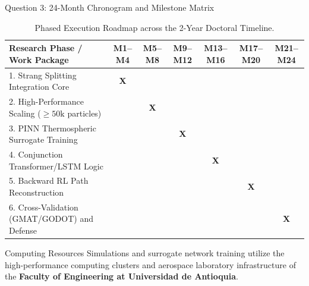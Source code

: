 \documentclass[aspectratio=169,10pt]{beamer}
\begin{document}
\begin{frame}{Question 3: 24-Month Chronogram and Milestone Matrix}
    \begin{table}
        \centering
        \scriptsize
        \begin{tabularx}{\textwidth}{Xcccccc}
            \toprule
            \textbf{Research Phase / Work Package} & \textbf{M1--M4} & \textbf{M5--M8} & \textbf{M9--M12} & \textbf{M13--M16} & \textbf{M17--M20} & \textbf{M21--M24} \\
            \midrule
            1. Strang Splitting Integration Core & \textbf{X} & & & & & \\
            2. High-Performance Scaling ($\ge 50\text{k}$ particles) & & \textbf{X} & & & & \\
            3. PINN Thermospheric Surrogate Training & & & \textbf{X} & & & \\
            4. Conjunction Transformer/LSTM Logic & & & & \textbf{X} & & \\
            5. Backward RL Path Reconstruction & & & & & \textbf{X} & \\
            6. Cross-Validation (GMAT/GODOT) and Defense & & & & & & \textbf{X} \\
            \bottomrule
        \end{tabularx}
        \caption{Phased Execution Roadmap across the 2-Year Doctoral Timeline.}
    \end{table}

    \vspace{-0.1cm}
    \begin{block}{Computing Resources}
        \footnotesize
        Simulations and surrogate network training utilize the high-performance computing clusters and aerospace laboratory infrastructure of the \textbf{Faculty of Engineering at Universidad de Antioquia}.
    \end{block}
\end{frame}
\end{document}
